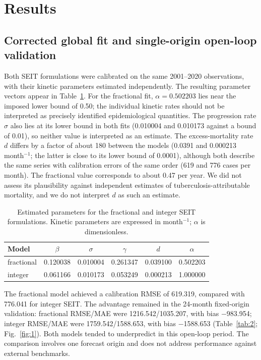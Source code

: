 \documentclass[pdflatex,sn-mathphys-ay,lineno]{sn-jnl}
\begin{document}
\section{Results}

\subsection{Corrected global fit and single-origin open-loop validation}

Both SEIT formulations were calibrated on the same 2001--2020 observations, with their kinetic parameters estimated independently. The resulting parameter vectors appear in Table~\ref{tab:1}. For the fractional fit, $\alpha=0.502203$ lies near the imposed lower bound of 0.50; the individual kinetic rates should not be interpreted as precisely identified epidemiological quantities. The progression rate $\sigma$ also lies at its lower bound in both fits (0.010004 and 0.010173 against a bound of 0.01), so neither value is interpreted as an estimate. The excess-mortality rate $d$ differs by a factor of about 180 between the models (0.0391 and 0.000213 month$^{-1}$; the latter is close to its lower bound of 0.0001), although both describe the same series with calibration errors of the same order (619 and 776 cases per month). The fractional value corresponds to about 0.47 per year. We did not assess its plausibility against independent estimates of tuberculosis-attributable mortality, and we do not interpret $d$ as such an estimate.

\begin{table}[htbp]
\centering
\small
\caption{Estimated parameters for the fractional and integer SEIT formulations. Kinetic parameters are expressed in month$^{-1}$; $\alpha$ is dimensionless.}
\label{tab:1}
\begin{tabular}{@{}lccccc@{}}
\toprule
Model & $\beta$ & $\sigma$ & $\gamma$ & $d$ & $\alpha$ \\
\midrule
fractional & 0.120038 & 0.010004 & 0.261347 & 0.039100 & 0.502203 \\
integer & 0.061166 & 0.010173 & 0.053249 & 0.000213 & 1.000000 \\
\bottomrule
\end{tabular}
\end{table}

The fractional model achieved a calibration RMSE of 619.319, compared with 776.041 for integer SEIT. The advantage remained in the 24-month fixed-origin validation: fractional RMSE/MAE were 1216.542/1035.207, with bias $-$983.954; integer RMSE/MAE were 1759.542/1588.653, with bias $-$1588.653 (Table~\ref{tab:2}; Fig.~\ref{fig:1}). Both models tended to underpredict in this open-loop period. The comparison involves one forecast origin and does not address performance against external benchmarks.
\end{document}
